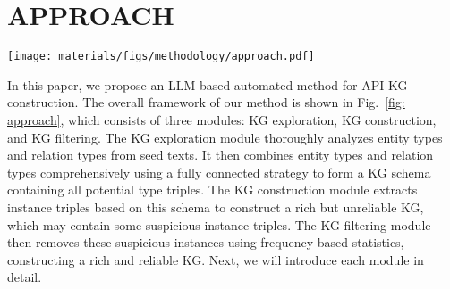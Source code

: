 \section{APPROACH}

\begin{figure*}[t]
    \centering
    \texttt{[image: materials/figs/methodology/approach.pdf]}
    \caption{Overall Framework of Our Method.}
    \label{fig: approach}
\end{figure*}

In this paper, we propose an LLM-based automated method for API KG construction.
The overall framework of our method is shown in Fig.~\ref{fig: approach}, which consists of three modules: KG exploration, KG construction, and KG filtering.
The KG exploration module thoroughly analyzes entity types and relation types from seed texts.
It then combines entity types and relation types comprehensively using a fully connected strategy to form a KG schema containing all potential type triples.
The KG construction module extracts instance triples based on this schema to construct a rich but unreliable KG, which may contain some suspicious instance triples.
The KG filtering module then removes these suspicious instances using frequency-based statistics, constructing a rich and reliable KG.
Next, we will introduce each module in detail.


